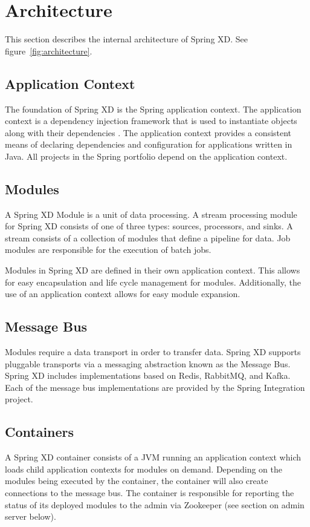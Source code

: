 \section{Architecture}
This section describes the internal architecture of Spring XD. See
figure~\ref{fig:architecture}.

\subsection{Application Context}
The foundation of Spring XD is the Spring application context. The application
context is a dependency injection framework that is used to instantiate
objects along with their dependencies \cite{spring-framework-reference}.
The application context provides a consistent means of declaring dependencies
and configuration for applications written in Java. All projects in the
Spring portfolio depend on the application context.

\subsection{Modules}
A Spring XD Module is a unit of data processing. A stream processing module
for Spring XD consists of one of three types: sources, processors, and sinks.
A stream consists of a collection of modules that define a pipeline for data. 
Job modules are responsible for the execution of batch jobs.

Modules in Spring XD are defined in their own application context. This allows
for easy encapsulation and life cycle management for modules. Additionally,
the use of an application context allows for easy module expansion.

\subsection{Message Bus}
Modules require a data transport in order to transfer data. Spring XD
supports pluggable transports via a messaging abstraction known as 
the Message Bus. Spring XD includes implementations based on Redis, RabbitMQ,
and Kafka. Each of the message bus implementations are provided by the
Spring Integration project.

\subsection{Containers}
A Spring XD container consists of a JVM running an application context which
loads child application contexts for modules on demand. Depending on the modules
being executed by the container, the container will also create connections to
the message bus. The container is responsible for reporting the status of its deployed
modules to the admin via Zookeeper (see section on admin server below).

